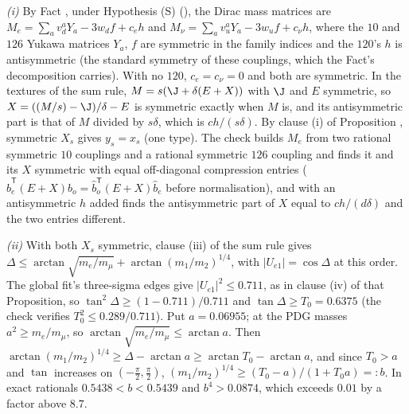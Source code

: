 \emph{(i)} By Fact , under Hypothesis (S) (), the Dirac mass matrices are $M_{e} = \sum_{a}v_{d}^{a}Y_{a} - 3w_{d}f + c_{e}h$ and $M_{\nu} = \sum_{a}v_{u}^{a}Y_{a} - 3w_{u}f + c_{\nu}h$, where the $10$ and $126$ Yukawa matrices $Y_{a}$, $f$ are symmetric in the family indices and the $120$'s $h$ is antisymmetric (the standard symmetry of these couplings, which the Fact's decomposition carries). With no $120$, $c_{e} = c_{\nu} = 0$ and both are symmetric. In the textures of the sum rule, $M = s(\J + \delta(E + X))$ with $\J$ and $E$ symmetric, so $X = ((M/s) - \J)/\delta - E$ is symmetric exactly when $M$ is, and its antisymmetric part is that of $M$ divided by $s\delta$, which is $c h/(s\delta)$. By clause (i) of Proposition , symmetric $X_{s}$ gives $y_{s} = x_{s}$ (one type). The check builds $M_{e}$ from two rational symmetric $10$ couplings and a rational symmetric $126$ coupling and finds it and its $X$ symmetric with equal off-diagonal compression entries ($\hat{b}_{e}^{\mathsf{T}}(E + X)\hat{b}_{o} = \hat{b}_{o}^{\mathsf{T}}(E + X)\hat{b}_{e}$ before normalisation), and with an antisymmetric $h$ added finds the antisymmetric part of $X$ equal to $c h/(d\delta)$ and the two entries different.

\emph{(ii)} With both $X_{s}$ symmetric, clause (iii) of the sum rule gives $\Delta \le \arctan\sqrt{m_{e}/m_{\mu}} + \arctan(m_{1}/m_{2})^{1/4}$, with $|U_{e1}| = \cos\Delta$ at this order. The global fit's three-sigma edges give $|U_{e1}|^{2} \le 0.711$, as in clause (iv) of that Proposition, so $\tan^{2}\Delta \ge (1 - 0.711)/0.711$ and $\tan\Delta \ge T_{0} = 0.6375$ (the check verifies $T_{0}^{2} \le 0.289/0.711$). Put $a = 0.06955$; at the PDG masses $a^{2} \ge m_{e}/m_{\mu}$, so $\arctan\sqrt{m_{e}/m_{\mu}} \le \arctan a$. Then $\arctan(m_{1}/m_{2})^{1/4} \ge \Delta - \arctan a \ge \arctan T_{0} - \arctan a$, and since $T_{0} > a$ and $\tan$ increases on $(-\tfrac{\pi}{2}, \tfrac{\pi}{2})$, $(m_{1}/m_{2})^{1/4} \ge (T_{0} - a)/(1 + T_{0}a) =: b$. In exact rationals $0.5438 < b < 0.5439$ and $b^{4} > 0.0874$, which exceeds $0.01$ by a factor above $8.7$.

